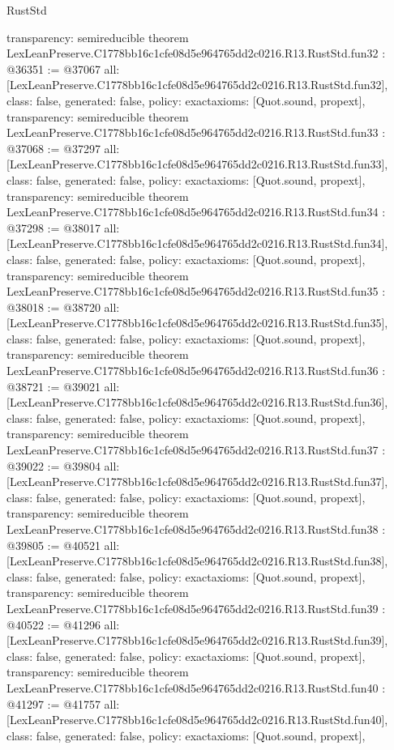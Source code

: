 \begin{lexlean}{RustStd}
\begin{coremodule}
{  transparency: semireducible
}
theorem LexLeanPreserve.C1778bb16c1cfe08d5e964765dd2c0216.R13.RustStd.fun32 : @36351 := @37067 {
  all: [LexLeanPreserve.C1778bb16c1cfe08d5e964765dd2c0216.R13.RustStd.fun32],
  class: false,
  generated: false,
  policy: exact{axioms: [Quot.sound, propext]},
  transparency: semireducible
}
theorem LexLeanPreserve.C1778bb16c1cfe08d5e964765dd2c0216.R13.RustStd.fun33 : @37068 := @37297 {
  all: [LexLeanPreserve.C1778bb16c1cfe08d5e964765dd2c0216.R13.RustStd.fun33],
  class: false,
  generated: false,
  policy: exact{axioms: [Quot.sound, propext]},
  transparency: semireducible
}
theorem LexLeanPreserve.C1778bb16c1cfe08d5e964765dd2c0216.R13.RustStd.fun34 : @37298 := @38017 {
  all: [LexLeanPreserve.C1778bb16c1cfe08d5e964765dd2c0216.R13.RustStd.fun34],
  class: false,
  generated: false,
  policy: exact{axioms: [Quot.sound, propext]},
  transparency: semireducible
}
theorem LexLeanPreserve.C1778bb16c1cfe08d5e964765dd2c0216.R13.RustStd.fun35 : @38018 := @38720 {
  all: [LexLeanPreserve.C1778bb16c1cfe08d5e964765dd2c0216.R13.RustStd.fun35],
  class: false,
  generated: false,
  policy: exact{axioms: [Quot.sound, propext]},
  transparency: semireducible
}
theorem LexLeanPreserve.C1778bb16c1cfe08d5e964765dd2c0216.R13.RustStd.fun36 : @38721 := @39021 {
  all: [LexLeanPreserve.C1778bb16c1cfe08d5e964765dd2c0216.R13.RustStd.fun36],
  class: false,
  generated: false,
  policy: exact{axioms: [Quot.sound, propext]},
  transparency: semireducible
}
theorem LexLeanPreserve.C1778bb16c1cfe08d5e964765dd2c0216.R13.RustStd.fun37 : @39022 := @39804 {
  all: [LexLeanPreserve.C1778bb16c1cfe08d5e964765dd2c0216.R13.RustStd.fun37],
  class: false,
  generated: false,
  policy: exact{axioms: [Quot.sound, propext]},
  transparency: semireducible
}
theorem LexLeanPreserve.C1778bb16c1cfe08d5e964765dd2c0216.R13.RustStd.fun38 : @39805 := @40521 {
  all: [LexLeanPreserve.C1778bb16c1cfe08d5e964765dd2c0216.R13.RustStd.fun38],
  class: false,
  generated: false,
  policy: exact{axioms: [Quot.sound, propext]},
  transparency: semireducible
}
theorem LexLeanPreserve.C1778bb16c1cfe08d5e964765dd2c0216.R13.RustStd.fun39 : @40522 := @41296 {
  all: [LexLeanPreserve.C1778bb16c1cfe08d5e964765dd2c0216.R13.RustStd.fun39],
  class: false,
  generated: false,
  policy: exact{axioms: [Quot.sound, propext]},
  transparency: semireducible
}
theorem LexLeanPreserve.C1778bb16c1cfe08d5e964765dd2c0216.R13.RustStd.fun40 : @41297 := @41757 {
  all: [LexLeanPreserve.C1778bb16c1cfe08d5e964765dd2c0216.R13.RustStd.fun40],
  class: false,
  generated: false,
  policy: exact{axioms: [Quot.sound, propext]},
}
\end{coremodule}
\end{lexlean}
